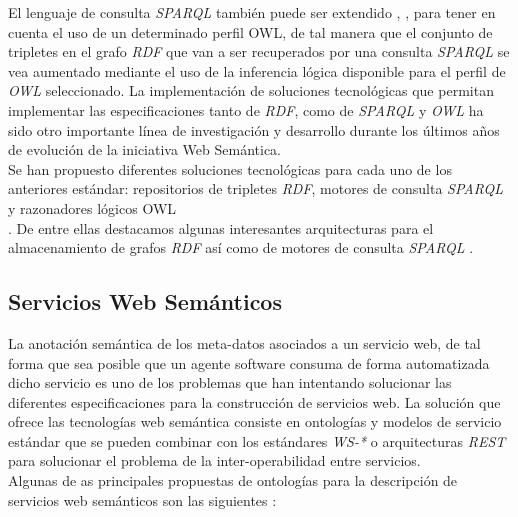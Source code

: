 El lenguaje de consulta \textit{SPARQL} tambi\'en puede ser extendido \cite{sirin2007sparql}, \cite{glimm2009sparql}, para tener en cuenta el uso de un determinado perfil OWL, de tal manera que el conjunto de tripletes en el grafo \textit{RDF} que van a ser recuperados por una consulta \textit{SPARQL} se vea aumentado mediante el uso de la inferencia l\'ogica disponible para el perfil de \textit{OWL} seleccionado.
La implementaci\'on de soluciones tecnol\'ogicas que permitan implementar las especificaciones tanto de \textit{RDF}, como de \textit{SPARQL} y \textit{OWL} ha sido otro importante l\'inea de investigaci\'on y desarrollo durante los \'ultimos a\~nos de evoluci\'on de la iniciativa Web Sem\'antica.\\
Se han propuesto diferentes soluciones tecnol\'ogicas para cada uno de los anteriores est\'andar: repositorios de tripletes \textit{RDF}, motores de consulta \textit{SPARQL} y razonadores l\'ogicos OWL\\. 
De entre ellas destacamos algunas interesantes arquitecturas para el almacenamiento de grafos \textit{RDF} as\'i como de motores de consulta \textit{SPARQL} \cite{yars} \cite{rohloff2010high}.\\

\subsection{Servicios Web Sem\'anticos}

La anotaci\'on sem\'antica de los meta-datos asociados a un servicio web, de tal forma que sea posible que un agente software consuma de forma automatizada dicho servicio es uno de los problemas que han intentando solucionar las diferentes especificaciones para la construcci\'on de servicios web. La soluci\'on que ofrece las tecnolog\'ias web sem\'antica consiste en ontolog\'ias y modelos de servicio est\'andar que se pueden combinar con los est\'andares \textit{WS-*} o arquitecturas \textit{REST} para solucionar el problema de la inter-operabilidad entre servicios.\\
Algunas de as principales propuestas de ontolog\'ias para la descripci\'on de servicios web sem\'anticos son las siguientes \cite{lanthaler2010semantic}:

